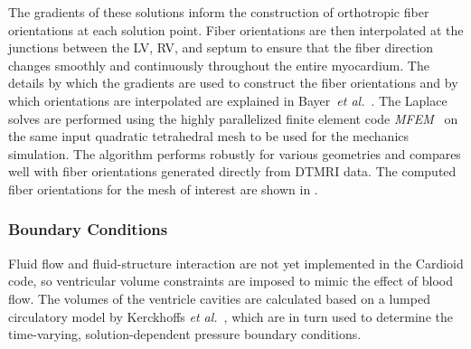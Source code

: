 The gradients of these solutions inform the construction of orthotropic fiber orientations at each solution point. Fiber orientations are then interpolated at the junctions between the LV, RV, and septum to ensure that the fiber direction changes smoothly and continuously throughout the entire myocardium. The details by which the gradients are used to construct the fiber orientations and by which orientations are interpolated are explained in Bayer~\textit{et al.}~\cite{bayer_2012}. The Laplace solves are performed using the highly parallelized finite element code \textit{MFEM}~\cite{mfem-library} on the same input quadratic tetrahedral mesh to be used for the mechanics simulation. The algorithm performs robustly for various geometries and compares well with fiber orientations generated directly from DTMRI data. The computed fiber orientations for the mesh of interest are shown in .

\subsubsection{Boundary Conditions}
\label{Boundary Conditions}

Fluid flow and fluid-structure interaction are not yet implemented in the Cardioid code, so ventricular volume constraints are imposed to mimic the effect of blood flow. The volumes of the ventricle cavities are calculated based on a lumped circulatory model by Kerckhoffs \textit{et al.}~\cite{kerckhoffs_2006}, which are in turn used to determine the time-varying, solution-dependent pressure boundary conditions.

